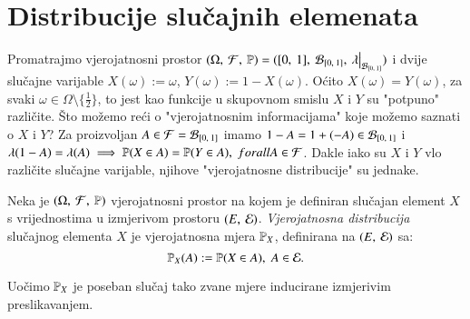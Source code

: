 
\chapter{Distribucije slu\v cajnih elemenata} \label{dist_sl_elem}

\begin{pr}  \label{pr:5.1}
    Promatrajmo vjerojatnosni prostor $\vjerojatnosniProstor = (\segment{0}{1}, \: \borel{\segment{0}{1}}, \: \restr{\lambda}{\borel{\segment{0}{1}}})$ i dvije slu\v cajne varijable $X (\omega) := \omega$, $Y (\omega) := 1 - X (\omega)$.
    O\' cito $X(\omega) = Y(\omega)$, za svaki $\omega \in \Omega \setminus \{ \frac{1}{2} \}$, to jest kao funkcije u skupovnom smislu $X$ i $Y$ su "potpuno" razli\v cite.
    \v Sto mo\v zemo re\' ci o "vjerojatnosnim informacijama" koje mo\v zemo saznati o $X$ i $Y$?
    Za proizvoljan $A \in \mathcal{F} = \mathcal{B}_{[{0}, \:{1}]}$ imamo $1-A = 1 + (-A) \in \mathcal{B}_{[{0}, \:{1}]}$ i $\lambda (1 - A) = \lambda (A) \implies \mathbb{P}({X \in A}) = \mathbb{P}({Y \in A}), \; forall A \in \mathcal{F}$.
    Dakle iako su $X$ i $Y$ vlo razli\v cite slu\v cajne varijable, njihove "vjerojatnosne distribucije" su jednake.
\end{pr}

\begin{defn}    \label{defn:5.2}
    Neka je $(\Omega, \: \mathcal{F}, \: \mathbb{P})$ vjerojatnosni prostor na kojem je definiran slu\v cajan element $X$ s vrijednostima u izmjerivom prostoru $({E}, \: {\mathcal{E}})$.
    \emph{Vjerojatnosna distribucija} slu\v cajnog elementa $X$ je vjerojatnosna mjera $\mathbb{P}_X$, definirana na $({E}, \: {\mathcal{E}})$
    sa:
    \begin{equation*}
        \mathbb{P}_X (A) := \mathbb{P}(X \in A), \; A \in \mathcal{E}.
    \end{equation*}
\end{defn}

Uo\v cimo $\mathbb{P}_X$ je poseban slu\v caj tako zvane mjere inducirane izmjerivim preslikavanjem.


